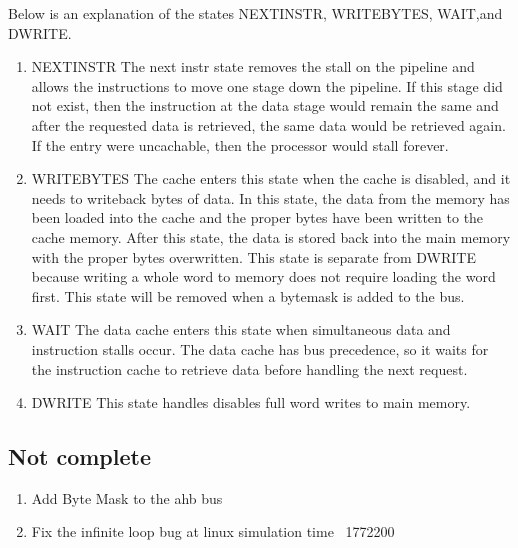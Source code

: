Below is an explanation of the states NEXTINSTR, WRITEBYTES, WAIT,and DWRITE.

\begin{enumerate}
	\item NEXTINSTR
	The next instr state removes the stall on the pipeline and allows the instructions to move one stage down the pipeline. If this stage did not exist, then the instruction at the data stage would remain the same and after the requested data is retrieved, the same data would be retrieved again. If the entry were uncachable, then the processor would stall forever.

	\item WRITEBYTES
	The cache enters this state when the cache is disabled, and it needs to writeback bytes of data. In this state, the data from the memory has been loaded into the cache and the proper bytes have been written to the cache memory. After this state, the data is stored back into the main memory with the proper bytes overwritten. This state is separate from DWRITE because writing a whole word to memory does not require loading the word first. This state will be removed when a bytemask is added to the bus.

	\item WAIT
	The data cache enters this state when simultaneous data and instruction stalls occur. The data cache has bus precedence, so it waits for the instruction cache to retrieve data before handling the next request. 

	\item DWRITE
	This state handles disables full word writes to main memory.
	
\end{enumerate}

\subsection{Not complete}

\begin{enumerate}
	\item Add Byte Mask to the ahb bus
	\item Fix the infinite loop bug at linux simulation time ~1772200
\end{enumerate}